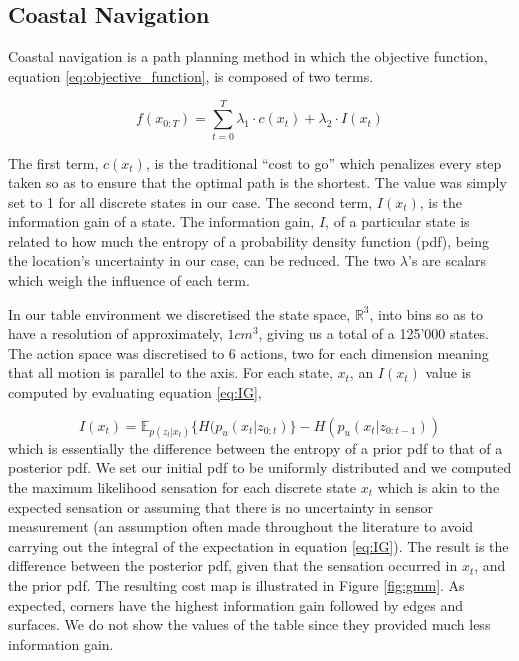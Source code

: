 \subsection{Coastal Navigation}

Coastal navigation \cite{CostalNavigation1999} is a path planning method in which the objective function, equation \ref{eq:objective_function}, is composed of two terms.

\begin{equation}\label{eq:objective_function}
 f(x_{0:T}) = \sum\limits_{t=0}^{T} \lambda_1 \cdot c(x_t) + \lambda_2 \cdot I(x_t)
\end{equation}

The first term, $c(x_t)$, is the traditional ``cost to go'' which penalizes every step taken so as to ensure that the
optimal path is the shortest. The value was simply set to 1 for all discrete states in our case. The second term, $I(x_t)$, 
is the information gain of a state. The information gain, $I$, of a particular state is related to how much 
the entropy of a probability density function (pdf), being the location's uncertainty in our case, can be reduced. The two $\lambda$'s are scalars which weigh the influence 
of each term.

In our table environment we discretised the state space, $\mathbb{R}^3$, into bins so as to have a resolution of approximately, $1 cm^3$, giving us a total of a 125'000
states. The action space was discretised to 6 actions, two for each dimension meaning that all motion is parallel to the axis. For each state, $x_t$, an $I(x_t)$ value is
computed by evaluating equation \ref{eq:IG},


\begin{equation}\label{eq:IG}
 I(x_t) = \mathbb{E}_{p(z_t|x_t)}\{ H(p_u(x_t|z_{0:t}) \} - H(p_u(x_t|z_{0:t-1}))
\end{equation}
which is essentially the difference between the entropy of a prior pdf to that of a posterior pdf.
We set our initial pdf to be uniformly distributed and  we computed the maximum likelihood sensation for each discrete state $x_t$
which is akin to the expected sensation or assuming that there is no uncertainty in sensor measurement (an assumption often made throughout the literature to avoid carrying out the integral of the expectation in equation \ref{eq:IG}).
The result is the difference between the posterior pdf, given that the sensation occurred in $x_t$, and the prior pdf. The resulting cost
map is illustrated in Figure \ref{fig:gmm}. As expected, corners have the highest information gain followed by edges and surfaces. 
We do not show the values of the table since they provided much less information gain.

